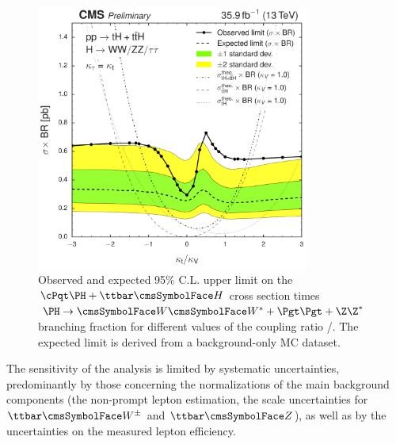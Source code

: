 \begin{figure}[!h]
  \centering
  \includegraphics[width=0.8\textwidth]{Figures/xs_limits_K6.pdf}
  \caption{Observed and expected 95\% C.L. upper limit on the $\tH+\ttH$ cross section times $\PH\to\W\W^*+\tautau+\Z\Z^*$ branching fraction for different values of the coupling ratio \Ct/\CV. The expected limit is derived from a background-only MC dataset. %
  \label{fig:limits}}
\end{figure}

The sensitivity of the analysis is limited by systematic uncertainties, predominantly by those concerning the normalizations of the main background components (the non-prompt lepton estimation, the scale uncertainties for $\ttW$ and $\ttZ$), as well as by the uncertainties on the measured lepton efficiency.
